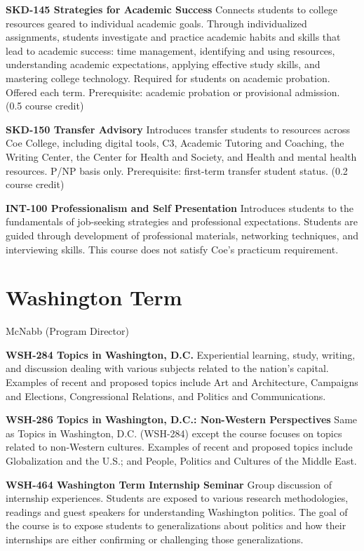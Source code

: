 \documentclass[
  letterpaper,
]{scrbook}
\begin{document}
\textbf{SKD-145 Strategies for Academic Success} Connects students to
college resources geared to individual academic goals. Through
individualized assignments, students investigate and practice academic
habits and skills that lead to academic success: time management,
identifying and using resources, understanding academic expectations,
applying effective study skills, and mastering college technology.
Required for students on academic probation. Offered each term.
Prerequisite: academic probation or provisional admission. (0.5 course
credit)

\textbf{SKD-150 Transfer Advisory} Introduces transfer students to
resources across Coe College, including digital tools, C3, Academic
Tutoring and Coaching, the Writing Center, the Center for Health and
Society, and Health and mental health resources. P/NP basis only.
Prerequisite: first-term transfer student status. (0.2 course credit)

\textbf{INT-100 Professionalism and Self Presentation} Introduces
students to the fundamentals of job-seeking strategies and professional
expectations. Students are guided through development of professional
materials, networking techniques, and interviewing skills. This course
does not satisfy Coe's practicum requirement.

\section{Washington Term}\label{washington-term-1}

McNabb (Program Director)

\textbf{WSH-284 Topics in Washington, D.C.} Experiential learning,
study, writing, and discussion dealing with various subjects related to
the nation's capital. Examples of recent and proposed topics include Art
and Architecture, Campaigns and Elections, Congressional Relations, and
Politics and Communications.

\textbf{WSH-286 Topics in Washington, D.C.: Non-Western Perspectives}
Same as Topics in Washington, D.C. (WSH-284) except the course focuses
on topics related to non-Western cultures. Examples of recent and
proposed topics include Globalization and the U.S.; and People, Politics
and Cultures of the Middle East.

\textbf{WSH-464 Washington Term Internship Seminar} Group discussion of
internship experiences. Students are exposed to various research
methodologies, readings and guest speakers for understanding Washington
politics. The goal of the course is to expose students to
generalizations about politics and how their internships are either
confirming or challenging those generalizations.
\end{document}

